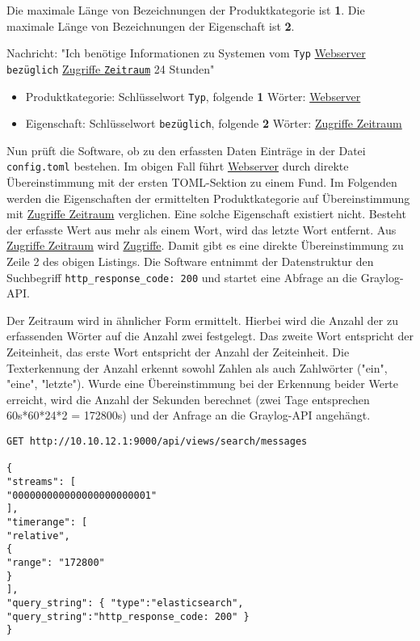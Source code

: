 Die maximale Länge von Bezeichnungen der Produktkategorie ist \textbf{1}. Die maximale Länge von Bezeichnungen der Eigenschaft ist \textbf{2}.

Nachricht: "Ich benötige Informationen zu Systemen vom \lstinline{Typ} \underline{Webserver} \lstinline{bezüglich} \underline{Zugriffe \lstinline{Zeitraum}} 24 Stunden"

\begin{itemize}
\item Produktkategorie: Schlüsselwort \lstinline{Typ}, folgende \textbf{1} Wörter: \underline{Webserver}
\item Eigenschaft: Schlüsselwort \lstinline{bezüglich}, folgende \textbf{2} Wörter: \underline{Zugriffe Zeitraum}
\end{itemize}

Nun prüft die Software, ob zu den erfassten Daten Einträge in der Datei \lstinline{config.toml} bestehen. Im obigen Fall führt \underline{Webserver} durch direkte Übereinstimmung mit der ersten TOML-Sektion zu einem Fund. Im Folgenden werden die Eigenschaften der ermittelten Produktkategorie auf Übereinstimmung mit \underline{Zugriffe Zeitraum} verglichen. Eine solche Eigenschaft existiert nicht. Besteht der erfasste Wert aus mehr als einem Wort, wird das letzte Wort entfernt. Aus \underline{Zugriffe Zeitraum} wird \underline{Zugriffe}. Damit gibt es eine direkte Übereinstimmung zu Zeile 2 des obigen Listings. Die Software entnimmt der Datenstruktur den Suchbegriff \lstinline{http_response_code: 200} und startet eine Abfrage an die Graylog-API.

Der Zeitraum wird in ähnlicher Form ermittelt. Hierbei wird die Anzahl der zu erfassenden Wörter auf die Anzahl zwei festgelegt. Das zweite Wort entspricht der Zeiteinheit, das erste Wort entspricht der Anzahl der Zeiteinheit. Die Texterkennung der Anzahl erkennt sowohl Zahlen als auch Zahlwörter ("ein", "eine", "letzte"). Wurde eine Übereinstimmung bei der Erkennung beider Werte erreicht, wird die Anzahl der Sekunden berechnet (zwei Tage entsprechen 60s*60*24*2 = 172800s) und der Anfrage an die Graylog-API angehängt.

\begin{lstlisting}[caption={Anfrage der Software an Graylog mit den ermittelten Daten}, label=config-toml, xleftmargin=6mm]
GET http://10.10.12.1:9000/api/views/search/messages

{
"streams": [
"000000000000000000000001"
],
"timerange": [
"relative",
{
"range": "172800"
}
],
"query_string": { "type":"elasticsearch", "query_string":"http_response_code: 200" }
}
\end{lstlisting}

